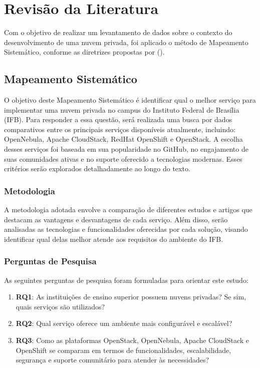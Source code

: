 \chapter{Revisão da Literatura}

Com o objetivo de realizar um levantamento de dados sobre o contexto do desenvolvimento de uma nuvem privada, foi aplicado o método de Mapeamento Sistemático, conforme as diretrizes propostas por (\cite{kitchenham2010systematic}).

\section{Mapeamento Sistemático}

O objetivo deste Mapeamento Sistemático é identificar qual o melhor serviço para implementar uma nuvem privada no campus do Instituto Federal de Brasília (IFB). Para responder a essa questão, será realizada uma busca por dados comparativos entre os principais serviços disponíveis atualmente, incluindo: OpenNebula, Apache CloudStack, RedHat OpenShift e OpenStack. A escolha desses serviços foi baseada em sua popularidade no GitHub, no engajamento de suas comunidades ativas e no suporte oferecido a tecnologias modernas. Esses critérios serão explorados detalhadamente ao longo do texto.

\subsection{Metodologia}

A metodologia adotada envolve a comparação de diferentes estudos e artigos que destacam as vantagens e desvantagens de cada serviço. Além disso, serão analisadas as tecnologias e funcionalidades oferecidas por cada solução, visando identificar qual delas melhor atende aos requisitos do ambiente do IFB.

\subsection{Perguntas de Pesquisa}

As seguintes perguntas de pesquisa foram formuladas para orientar este estudo:

\begin{enumerate}
    \item \textbf{RQ1}: As instituições de ensino superior possuem nuvens privadas? Se sim, quais serviços são utilizados?
    \item \textbf{RQ2}: Qual serviço oferece um ambiente mais configurável e escalável?
    \item \textbf{RQ3}: Como as plataformas OpenStack, OpenNebula, Apache CloudStack e OpenShift se comparam em termos de funcionalidades, escalabilidade, segurança e suporte comunitário para atender às necessidades?
\end{enumerate}

